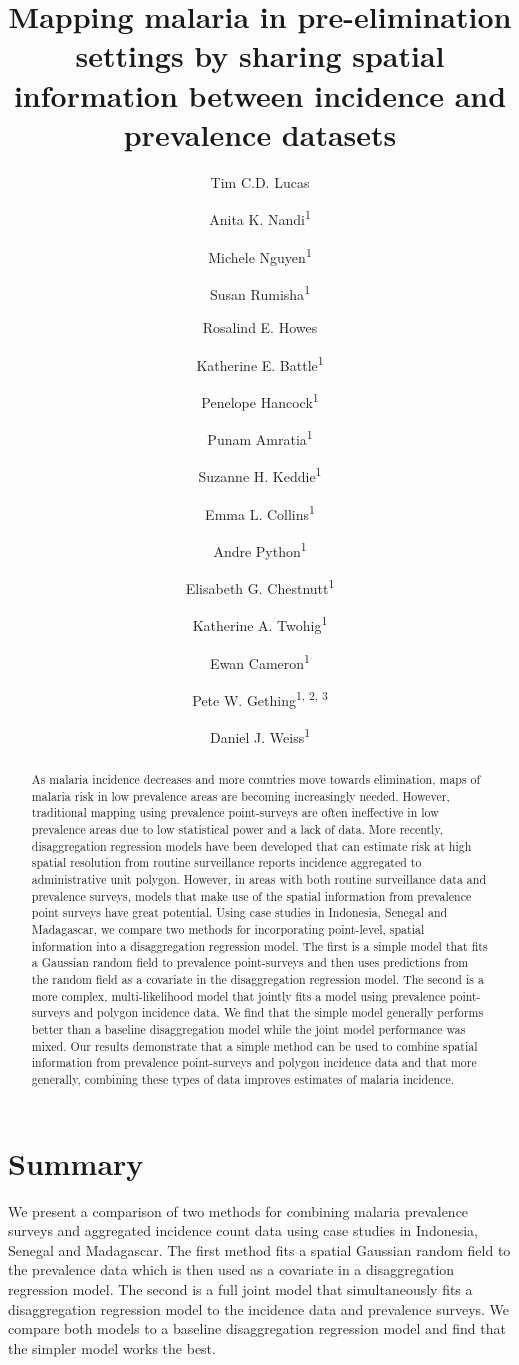 \documentclass{statsoc}
\title[Mapping malaria by sharing spatial information]{Mapping malaria in pre-elimination settings by sharing spatial information between incidence and prevalence datasets}
\author[Tim C.D. Lucas {\it et al.}]{Tim C.D. Lucas}
\author{Anita K. Nandi\textsuperscript{1}}
\author{Michele Nguyen\textsuperscript{1}}
\author{Susan Rumisha\textsuperscript{1}}
\author{Rosalind E. Howes}
\author{Katherine E. Battle\textsuperscript{1}}
\author{Penelope Hancock\textsuperscript{1}}
\author{Punam Amratia\textsuperscript{1}}
\author{Suzanne H. Keddie\textsuperscript{1}}
\author{Emma L. Collins\textsuperscript{1}}
\author{Andre Python\textsuperscript{1}}
\author{Elisabeth G. Chestnutt\textsuperscript{1}}
\author{Katherine A. Twohig\textsuperscript{1}}
\author{Ewan Cameron\textsuperscript{1}}
\author{Pete W. Gething\textsuperscript{1, 2, 3}}
\author{Daniel J. Weiss\textsuperscript{1}}
\begin{document}
\begin{abstract}
As malaria incidence decreases and more countries move towards elimination, maps of malaria risk in low prevalence areas are becoming increasingly needed.
However, traditional mapping using prevalence point-surveys are often ineffective in low prevalence areas due to low statistical power and a lack of data.
More recently, disaggregation regression models have been developed that can estimate risk at high spatial resolution from routine surveillance reports incidence aggregated to administrative unit polygon.
However, in areas with both routine surveillance data and prevalence surveys, models that make use of the spatial information from prevalence point surveys have great potential.
Using case studies in Indonesia, Senegal and Madagascar, we compare two methods for incorporating point-level, spatial information into a disaggregation regression model.
The first is a simple model that fits a Gaussian random field to prevalence point-surveys and then uses predictions from the random field as a covariate in the disaggregation regression model.
The second is a more complex, multi-likelihood model that jointly fits a model using prevalence point-surveys and  polygon incidence data.
We find that the simple model generally performs better than a baseline disaggregation model while the joint model performance was mixed.
Our results demonstrate that a simple method can be used to combine spatial information from prevalence point-surveys and polygon incidence data and that more generally, combining these types of data improves estimates of malaria incidence.
\end{abstract}


\section{Summary}

We present a comparison of two methods for combining malaria prevalence surveys and aggregated incidence count data using case studies in Indonesia, Senegal and Madagascar. 
The first method fits a spatial Gaussian random field to the prevalence data which is then used as a covariate in a disaggregation regression model.
The second is a full joint model that simultaneously fits a disaggregation regression model to the incidence data and prevalence surveys.
We compare both models to a baseline disaggregation regression model and find that the simpler model works the best.
\end{document}
